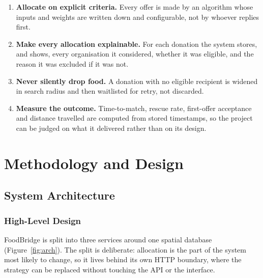 \documentclass[11pt,a4paper]{report}
\begin{document}
\begin{enumerate}
  \item \textbf{Allocate on explicit criteria.} Every offer is made by an
    algorithm whose inputs and weights are written down and configurable, not
    by whoever replies first.
  \item \textbf{Make every allocation explainable.} For each donation the system
    stores, and shows, every organisation it considered, whether it was eligible,
    and the reason it was excluded if it was not.
  \item \textbf{Never silently drop food.} A donation with no eligible recipient
    is widened in search radius and then waitlisted for retry, not discarded.
  \item \textbf{Measure the outcome.} Time-to-match, rescue rate, first-offer
    acceptance and distance travelled are computed from stored timestamps, so the
    project can be judged on what it delivered rather than on its design.
\end{enumerate}

\chapter{Methodology and Design}

\section{System Architecture}

\subsection{High-Level Design}

FoodBridge is split into three services around one spatial database
(Figure~\ref{fig:arch}). The split is deliberate: allocation is the part of the
system most likely to change, so it lives behind its own HTTP boundary, where
the strategy can be replaced without touching the API or the interface.
\end{document}
